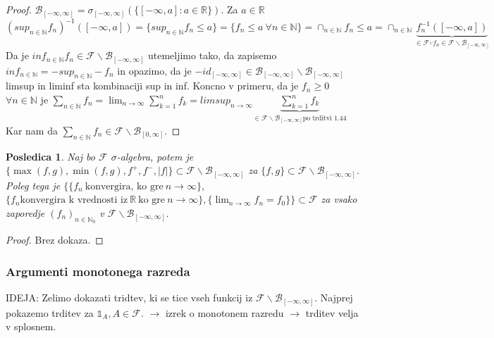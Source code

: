 \documentclass[a4paper,12pt]{article}
\theoremstyle{definition} %
\theoremstyle{plain} %
\newtheorem{posledica}[definicija]{Posledica}
\newcommand{\R}{\mathbb{R}}
\newcommand{\N}{\mathbb{N}}
\newcommand{\F}{\mathcal{F}}
\begin{document}
            \begin{proof}
                $\mathcal{B}_{[-\infty, \infty]} = \sigma_{[-\infty, \infty]}(\{[-\infty, a]: a\in\R\})$. Za $a \in \R$ 
                $\left(sup_{n \in \N}f_n\right)^{-1}\left([-\infty, a]\right) = \{sup_{n \in \N}f_n \leq a\} = \{f_n \leq a \ \forall n \in \N\} =
                 \cap_{n \in \N}{f_n \leq a}= \cap_{n \in \N}\underbrace{f_n^{-1}([-\infty, a])}_{\in \F \because f_n \in \F\backslash\mathcal{B}_{[-\infty, \infty]}}$
                 Da je $inf_{n \in \N}f_n \in \F\backslash\mathcal{B}_{[-\infty, \infty]}$ utemeljimo tako, da zapisemo $inf_{n \in \N} = -sup_{n \in \N} - f_n$ in opazimo, da je $-id_{[-\infty, \infty]} \in \mathcal{B}_{[-\infty, \infty]}\backslash\mathcal{B}_{[-\infty, \infty]}$
                 limsup in liminf sta kombinaciji sup in inf. Koncno v primeru, da je $f_n \geq 0$ $\forall n \in \N$ je $\sum_{n\in\N}f_n = \lim_{n \rightarrow \infty}\sum_{k = 1}^{n}f_k = limsup_{n \rightarrow \infty}\underbrace{\sum_{k = 1}^nf_k}_{\in \F\backslash\mathcal{B}_{[-\infty, \infty]} \text{po trditvi 1.44}}$
                 Kar nam da $\sum_{n \in \N}f_n \in \F\backslash\mathcal{B}_{[0, \infty]}$.
            \end{proof}

            \begin{posledica}
                Naj bo $\F$ $\sigma$-algebra, potem je $\{\max(f, g), \min(f, g), f^+, f^-, |f|\} \subset \F\backslash\mathcal{B}_{[-\infty, \infty]}$ za $\{f, g\} \subset \F\backslash\mathcal{B}_{[-\infty, \infty]}.$ Poleg tega je 
                $\{\{f_n \ \text{konvergira, ko gre} \ n \rightarrow \infty\},$ 
                $ \{f_n \text{konvergira k vrednosti iz} \ \R \ \text{ko gre} \ n \rightarrow \infty\}, \{\lim_{n \rightarrow \infty}f_n = f_0\}\} \subset \F$ za vsako
                zaporedje $(f_n)_{n \in \N_0}$ v $\F\backslash\mathcal{B}_{[-\infty, \infty]}.$
            \end{posledica}

            \begin{proof}
                Brez dokaza.
            \end{proof}

        \subsubsection{Argumenti monotonega razreda}
            IDEJA: Zelimo dokazati tridtev, ki se tice vseh funkcij iz $\F\backslash\mathcal{B}_{[-\infty, \infty]}.$ Najprej pokazemo trditev za 
            $\mathds{1}_A, A \in \F$. $\rightarrow$ izrek o monotonem razredu $\rightarrow$ trditev velja v splosnem.
\end{document}
